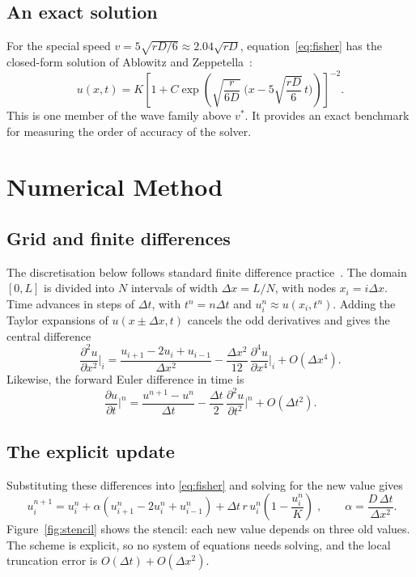 \documentclass[11pt,a4paper]{article}
\newcommand{\pd}[2]{\frac{\partial #1}{\partial #2}}
\newcommand{\pdd}[2]{\frac{\partial^2 #1}{\partial #2^2}}
\begin{document}
\subsection{An exact solution}
For the special speed $v=5\sqrt{rD/6}\approx2.04\sqrt{rD}$, equation~\eqref{eq:fisher} has the closed-form
solution of Ablowitz and Zeppetella~\cite{ablowitz}:
\begin{equation}
  u(x,t)=K\left[1+C\exp\!\left(\sqrt{\frac{r}{6D}}\;\Big(x-5\sqrt{\frac{rD}{6}}\,t\Big)\right)\right]^{-2}.
  \label{eq:exact}
\end{equation}
This is one member of the wave family above $v^*$. It provides an exact benchmark for measuring the
order of accuracy of the solver.

\section{Numerical Method}\label{sec:numerics}

\subsection{Grid and finite differences}
The discretisation below follows standard finite difference practice~\cite{leveque}.
The domain $[0,L]$ is divided into $N$ intervals of width $\Delta x=L/N$, with nodes $x_i=i\Delta x$.
Time advances in steps of $\Delta t$, with $t^n=n\Delta t$ and $u_i^n\approx u(x_i,t^n)$.
Adding the Taylor expansions of $u(x\pm\Delta x,t)$ cancels the odd derivatives and gives the
central difference
\begin{equation}
  \pdd{u}{x}\bigg|_i=\frac{u_{i+1}-2u_i+u_{i-1}}{\Delta x^2}-\frac{\Delta x^2}{12}\,\frac{\partial^4u}{\partial x^4}\bigg|_i+O(\Delta x^4).
\end{equation}
Likewise, the forward Euler difference in time is
\begin{equation}
  \pd{u}{t}\bigg|^n=\frac{u^{n+1}-u^n}{\Delta t}-\frac{\Delta t}{2}\,\pdd{u}{t}\bigg|^n+O(\Delta t^2).
\end{equation}

\subsection{The explicit update}
Substituting these differences into \eqref{eq:fisher} and solving for the new value gives
\begin{equation}
  \boxed{\;u_i^{n+1}=u_i^n+\alpha\left(u_{i+1}^n-2u_i^n+u_{i-1}^n\right)
  +\Delta t\,r\,u_i^n\left(1-\frac{u_i^n}{K}\right)\;},
  \qquad \alpha=\frac{D\,\Delta t}{\Delta x^2}.
  \label{eq:ftcs}
\end{equation}
Figure~\ref{fig:stencil} shows the stencil: each new value depends on three old values. The scheme is
explicit, so no system of equations needs solving, and the local truncation error is
$O(\Delta t)+O(\Delta x^2)$.
\end{document}
